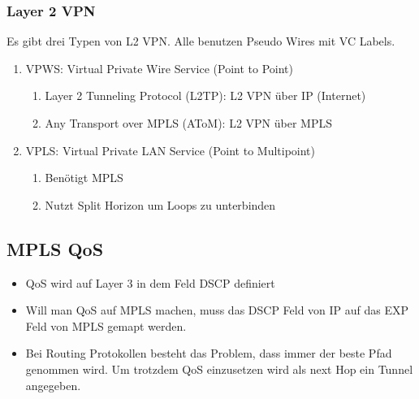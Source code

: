 \subsubsection{Layer 2 VPN}
Es gibt drei Typen von L2 VPN. Alle benutzen Pseudo Wires mit VC Labels.
\begin{enumerate}
	\item VPWS: Virtual Private Wire Service (Point to Point)
	\begin{enumerate}
		\item Layer 2 Tunneling Protocol (L2TP): L2 VPN über IP (Internet)
		\item Any Transport over MPLS (AToM): L2 VPN über MPLS
	\end{enumerate}
	\item VPLS: Virtual Private LAN Service (Point to Multipoint)
	\begin{enumerate}
		\item Benötigt MPLS
		\item Nutzt Split Horizon um Loops zu unterbinden
	\end{enumerate}
\end{enumerate}

\subsection{MPLS QoS}
\begin{itemize}
	\item QoS wird auf Layer 3 in dem Feld DSCP definiert
	\item Will man QoS auf MPLS machen, muss das DSCP Feld von IP auf das EXP Feld von MPLS gemapt werden.
	\item Bei Routing Protokollen besteht das Problem, dass immer der beste Pfad genommen wird. Um trotzdem QoS einzusetzen wird als next Hop ein Tunnel angegeben. 
\end{itemize}

